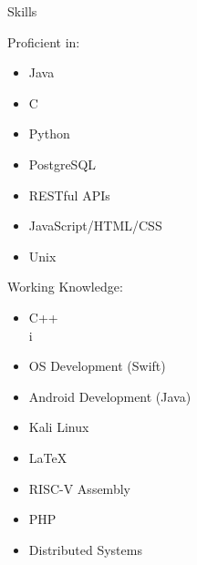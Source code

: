 \documentclass{res}
\begin{document}
\begin{resume}
{\huge Skills}\\[2mm]
\begin{minipage}{0.45\textwidth}
	\vspace{-5mm}
	{\Large Proficient in:}\\
		\begin{itemize}[noitemsep,nolistsep]
			\vspace{-3mm}
			\item Java\\
			\vspace{-3mm}
			\item C\\
			\vspace{-3mm}
			\item Python\\
			\vspace{-3mm}
			\item PostgreSQL\\
			\vspace{-3mm}
			\item RESTful APIs\\
			\vspace{-3mm}
			\item JavaScript/HTML/CSS\\
			\vspace{-3mm}
			\item Unix\\
		\end{itemize}
\end{minipage}
\begin{minipage}{0.45\textwidth}
	\vspace{1mm}
	{\Large Working Knowledge:}\\
		\begin{itemize}[noitemsep,nolistsep]
			\vspace{-3mm}
			\item C++\\
			\vspace{-3mm}
			i\item OS Development (Swift)\\
			\vspace{-3mm}
			\item Android Development (Java)\\
			\vspace{-3mm}
			\item Kali Linux\\
			\vspace{-3mm}
			\item \LaTeX\\
			\vspace{-3mm}
			\item RISC-V Assembly\\
			\vspace{-3mm}
			\item PHP\\
			\vspace{-3mm}
			\item Distributed Systems\\
		\end{itemize}
\end{minipage}
\vspace{-1mm}


\end{resume}
\end{document}
